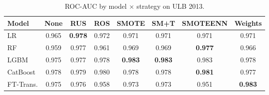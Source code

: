 \begin{table}[H]
\centering
\caption{ROC-AUC by model $\times$ strategy on ULB 2013.}
\label{tab:factorial_ulb_rocauc}
\begin{tabular}{l c c c c c c c}
\toprule
Model & None & RUS & ROS & SMOTE & SM+T & SMOTEENN & Weights \\
\midrule
LR         & 0.965 & \textbf{0.978} & 0.972 & 0.971 & 0.971 & 0.971 & 0.971 \\
RF         & 0.959 & 0.977 & 0.961 & 0.969 & 0.969 & \textbf{0.977} & 0.966 \\
LGBM       & 0.975 & 0.977 & 0.978 & \textbf{0.983} & \textbf{0.983} & 0.983 & 0.978 \\
CatBoost   & 0.978 & 0.979 & 0.980 & 0.978 & 0.978 & \textbf{0.981} & 0.977 \\
FT-Trans.  & 0.975 & 0.976 & 0.958 & 0.973 & 0.973 & 0.951 & \textbf{0.983} \\
\bottomrule
\end{tabular}
\end{table}